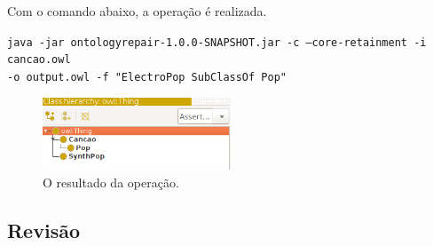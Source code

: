Com o comando abaixo, a operação é realizada.

\begin{small}
	\texttt{java -jar ontologyrepair-1.0.0-SNAPSHOT.jar -c --core-retainment -i cancao.owl \\ -o output.owl -f "ElectroPop SubClassOf Pop"}
\end{small}

\begin{figure}[H]
	\centering
	\includegraphics[width=0.5\textwidth]{Capitulos/Implementacao/ck2.png}
	\caption{O resultado da operação.}
\end{figure}

\subsection{Revisão}